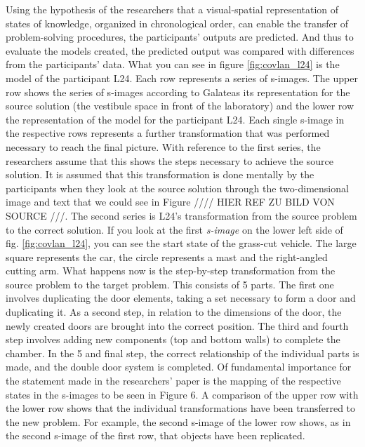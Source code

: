 \documentclass[12pt]{article}
\begin{document}
Using the hypothesis of the researchers that a visual-spatial representation of states of knowledge, organized in chronological order, can enable the transfer of problem-solving procedures, the participants' outputs are predicted. And thus to evaluate the models created, the predicted output was compared with differences from the participants' data. What you can see in figure \ref{fig:covlan_l24} is the model of the participant L24. Each row represents a series of s-images. The upper row shows the series of s-images according to Galateas its representation for the source solution (the vestibule space in front of the laboratory) and the lower row the representation of the model for the participant L24. Each single s-image in the respective rows represents a further transformation that was performed necessary to reach the final picture. With reference to the first series, the researchers assume that this shows the steps necessary to achieve the source solution. It is assumed that this transformation is done mentally by the participants when they look at the source solution through the two-dimensional image and text that we could see in Figure //// HIER REF ZU BILD VON SOURCE ///. The second series is L24's transformation from the source problem to the correct solution. If you look at the first \textit{s-image} on the lower left side of fig. \ref{fig:covlan_l24}, you can see the start state of the grass-cut vehicle. The large square represents the car, the circle represents a mast and the right-angled cutting arm. What happens now is the step-by-step transformation from the source problem to the target problem. This consists of 5 parts. The first one involves duplicating the door elements, taking a set necessary to form a door and duplicating it. As a second step, in relation to the dimensions of the door, the newly created doors are brought into the correct position. The third and fourth step involves adding new components (top and bottom walls) to complete the chamber. In the 5 and final step, the correct relationship of the individual parts is made, and the double door system is completed. Of fundamental importance for the statement made in the researchers' paper is the mapping of the respective states in the s-images to be seen in Figure 6. A comparison of the upper row with the lower row shows that the individual transformations have been transferred to the new problem. For example, the second s-image of the lower row shows, as in the second s-image of the first row, that objects have been replicated.


\end{document}
